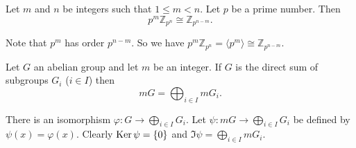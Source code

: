 \begin{lemma} \label{lemma-FGAG-small-1}
	Let $m$ and $n$ be integers such that $1\leq m<n$. Let $p$ be a prime number. Then $$p^m\mathbb{Z}_{p^n}\cong \mathbb{Z}_{p^{n-m}}.$$
\end{lemma}
\begin{sketch}
	Note that $p^m$ has order $p^{n-m}$. So we have $p^m \mathbb{Z}_{p^n} = \langle p^m \rangle  \cong \mathbb{Z}_{p^{n-m}}$.
\end{sketch}
\begin{lemma} \label{lemma-FGAG-small-2}
	Let $G$ an abelian group and let $m$ be an integer. If $G$ is the direct sum of  subgroups $G_i$ ($i\in I$) then
	\begin{equation*}
		mG = \bigoplus_{i\in I}mG_i.
	\end{equation*}
\end{lemma}
\begin{sketch}
	There is an isomorphism $\varphi: G\rightarrow \bigoplus_{i\in I}G_i$. Let $\psi:mG \rightarrow \bigoplus_{i\in I}G_i$ be defined by $\psi(x) = \varphi(x)$. Clearly $\operatorname{Ker} \psi = \{0\}$ and $\Im \psi = \bigoplus_{i\in I}mG_i$.
\end{sketch}

